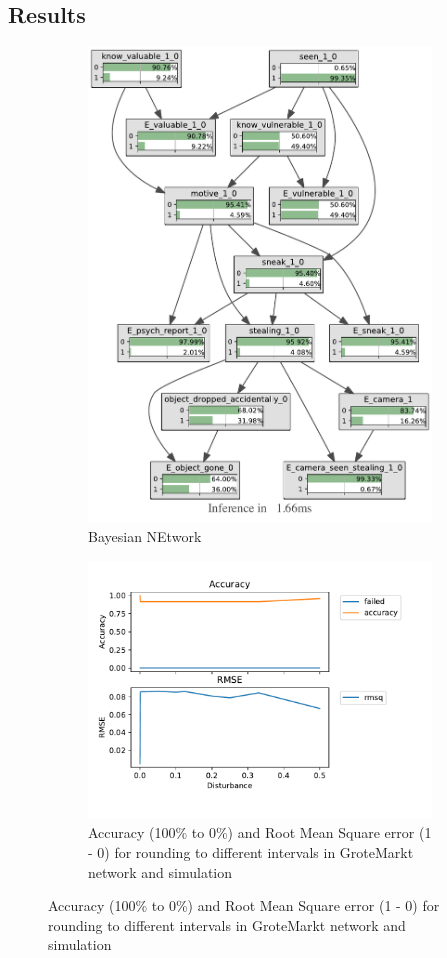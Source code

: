 \subsection{Results}
\begin{figure}[htbp]
\begin{center}
\begin{subfigure}{.7\textwidth}
\includegraphics[width=.7\linewidth]{../experiments/GroteMarkt/bnImage/BNIMAGEGroteMarkt.pdf}
\caption{Bayesian NEtwork}
\label{groteMarktperfo}
\end{subfigure}
\end{center}

\begin{subfigure}{.5\textwidth}
\includegraphics[width=.7\linewidth]{../experiments/GroteMarkt/plots/performance_GroteMarkt.pdf}
\caption{Accuracy (100\% to 0\%) and Root Mean Square error (1 - 0) for rounding to different intervals in GroteMarkt network and simulation}
\label{groteMarktperfo}
\end{subfigure}


\end{figure}
